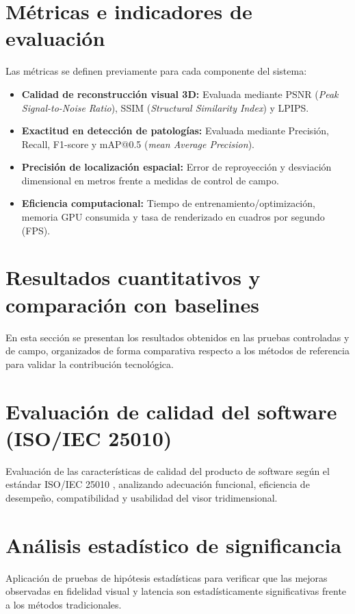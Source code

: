 \documentclass[12pt,oneside]{report}
\begin{document}
\section{Métricas e indicadores de evaluación}
Las métricas se definen previamente para cada componente del sistema:
\begin{itemize}
  \item \textbf{Calidad de reconstrucción visual 3D:} Evaluada mediante PSNR (\textit{Peak Signal-to-Noise Ratio}), SSIM (\textit{Structural Similarity Index}) y LPIPS.
  \item \textbf{Exactitud en detección de patologías:} Evaluada mediante Precisión, Recall, F1-score y mAP@0.5 (\textit{mean Average Precision}).
  \item \textbf{Precisión de localización espacial:} Error de reproyección y desviación dimensional en metros frente a medidas de control de campo.
  \item \textbf{Eficiencia computacional:} Tiempo de entrenamiento/optimización, memoria GPU consumida y tasa de renderizado en cuadros por segundo (FPS).
\end{itemize}

\section{Resultados cuantitativos y comparación con baselines}
En esta sección se presentan los resultados obtenidos en las pruebas controladas y de campo, organizados de forma comparativa respecto a los métodos de referencia para validar la contribución tecnológica.

\section{Evaluación de calidad del software (ISO/IEC 25010)}
Evaluación de las características de calidad del producto de software según el estándar ISO/IEC 25010 \citep{iso25010}, analizando adecuación funcional, eficiencia de desempeño, compatibilidad y usabilidad del visor tridimensional.

\section{Análisis estadístico de significancia}
Aplicación de pruebas de hipótesis estadísticas para verificar que las mejoras observadas en fidelidad visual y latencia son estadísticamente significativas frente a los métodos tradicionales.
\end{document}
